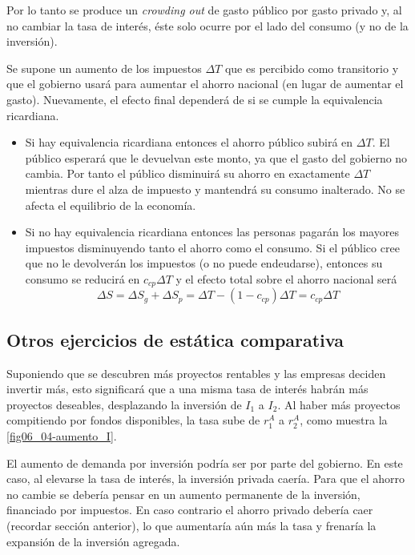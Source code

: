 \documentclass[DeGregorioResumen]{subfiles}
\begin{document}
Por lo tanto se produce un \textit{crowding out} de gasto público por gasto privado y, al no cambiar la tasa de interés, éste solo ocurre por el lado del consumo (y no de la inversión).


Se supone un aumento de los impuestos $\Delta T$ que es percibido como transitorio y que el gobierno usará para aumentar el ahorro nacional (en lugar de aumentar el gasto). Nuevamente, el efecto final dependerá de si se cumple la equivalencia ricardiana.

\begin{itemize}
\item Si hay equivalencia ricardiana entonces el ahorro público subirá en $\Delta T$. El público esperará que le devuelvan este monto, ya que el gasto del gobierno no cambia. Por tanto el público disminuirá su ahorro en exactamente $\Delta T$ mientras dure el alza de impuesto y mantendrá su consumo inalterado. No se afecta el equilibrio de la economía.

\item Si no hay equivalencia ricardiana entonces las personas pagarán los mayores impuestos disminuyendo tanto el ahorro como el consumo. Si el público cree que no le devolverán los impuestos (o no puede endeudarse), entonces su consumo se reducirá en $c_{cp}\Delta T$ y el efecto total sobre el ahorro nacional será
\begin{equation*}
\Delta S = \Delta S_g + \Delta S_p = \Delta T - (1-c_{cp})\Delta T = c_{cp}\Delta T
\end{equation*}
\end{itemize}


\subsection{Otros ejercicios de estática comparativa}


Suponiendo que se descubren más proyectos rentables y las empresas deciden invertir más, esto significará que a una misma tasa de interés habrán más proyectos deseables, desplazando la inversión de $I_1$ a $I_2$. Al haber más proyectos compitiendo por fondos disponibles, la tasa sube de $r_1^A$ a $r_2^A$, como muestra la \autoref{fig06_04-aumento_I}.



El aumento de demanda por inversión podría ser por parte del gobierno. En este caso, al elevarse la tasa de interés, la inversión privada caería. Para que el ahorro no cambie se debería pensar en un aumento permanente de la inversión, financiado por impuestos. En caso contrario el ahorro privado debería caer (recordar sección anterior), lo que aumentaría aún más la tasa y frenaría la expansión de la inversión agregada.
\end{document}
